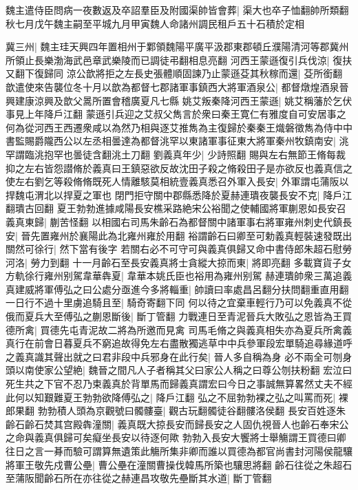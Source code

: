 魏主遣侍臣問病一夜數返及卒詔羣臣及附國渠帥皆會葬|{
	渠大也卒子恤翻帥所類翻}
秋七月戊午魏主嗣至平城九月甲寅魏人命諸州調民租戶五十石積於定相

冀三州|{
	魏主珪天興四年置相州于鄴領魏陽平廣平汲郡東郡頓丘濮陽清河等郡冀州所領止長樂渤海武邑章武樂陵而已調徒弔翻相息亮翻}
河西王蒙遜復引兵伐涼|{
	復扶又翻下復歸同}
涼公歆將拒之左長史張體順固諫乃止蒙遜芟其秋稼而還|{
	芟所銜翻}
歆遣使來告襲位冬十月以歆為都督七郡諸軍事鎮西大將軍酒泉公|{
	都督燉煌酒泉晉興建康涼興及歆父暠所置會稽廣夏凡七縣}
姚艾叛秦降河西王蒙遜|{
	姚艾稱藩於乞伏事見上年降戶江翻}
蒙遜引兵迎之艾叔父雋言於衆曰秦王寛仁有雅度自可安居事之何為從河西王西遷衆咸以為然乃相與逐艾推雋為主復歸於秦秦王熾磐徵雋為侍中中書監賜爵隴西公以左丞相曇達為都督洮罕以東諸軍事征東大將軍秦州牧鎮南安|{
	洮罕謂臨洮抱罕也曇徒含翻洮土刀翻}
劉義真年少|{
	少詩照翻}
賜與左右無節王脩每裁抑之左右皆怨譛脩於義真曰王鎮惡欲反故沈田子殺之脩殺田子是亦欲反也義真信之使左右劉乞等殺脩脩既死人情離駭莫相統壹義真悉召外軍入長安|{
	外軍謂屯蒲阪以捍魏屯渭北以捍夏之軍也}
閉門拒守關中郡縣悉降於夏赫連璝夜襲長安不克|{
	降戶江翻璝古回翻}
夏王勃勃進據咸陽長安樵采路絶宋公裕聞之使輔國將軍蒯恩如長安召義真東歸|{
	蒯苦怪翻}
以相國右司馬朱齡石為都督關中諸軍事右將軍雍州刺史代鎮長安|{
	晉先置雍州於襄陽此為北雍州雍於用翻}
裕謂齡石曰卿至可勅義真輕裝速發既出關然可徐行|{
	然下當有後字}
若關右必不可守可與義真俱歸又命中書侍郎朱超石慰勞河洛|{
	勞力到翻}
十一月齡石至長安義真將士貪縱大掠而東|{
	將即亮翻}
多載寶貨子女方軌徐行雍州别駕韋華犇夏|{
	韋華本姚氏臣也裕用為雍州别駕}
赫連璝帥衆三萬追義真建威將軍傅弘之曰公處分亟進今多將輜重|{
	帥讀曰率處昌呂翻分扶問翻重直用翻}
一日行不過十里虜追騎且至|{
	騎奇寄翻下同}
何以待之宜棄車輕行乃可以免義真不從俄而夏兵大至傅弘之蒯恩斷後|{
	斷丁管翻}
力戰連日至青泥晉兵大敗弘之恩皆為王買德所禽|{
	買德先屯青泥故二將為所邀而見禽}
司馬毛脩之與義真相失亦為夏兵所禽義真行在前會日暮夏兵不窮追故得免左右盡散獨逃草中中兵參軍段宏單騎追尋緣道呼之義真識其聲出就之曰君非段中兵邪身在此行矣|{
	晉人多自稱為身}
必不兩全可刎身頭以南使家公望絶|{
	魏晉之間凡人子者稱其父曰家公人稱之曰尊公刎扶粉翻}
宏泣曰死生共之下官不忍乃束義真於背單馬而歸義真謂宏曰今日之事誠無算畧然丈夫不經此何以知艱難夏王勃勃欲降傅弘之|{
	降戶江翻}
弘之不屈勃勃裸之弘之叫罵而死|{
	裸郎果翻}
勃勃積人頭為京觀號曰髑髏臺|{
	觀古玩翻髑徒谷翻髏洛侯翻}
長安百姓逐朱齡石齡石焚其宫殿犇潼關|{
	義真既大掠長安而歸長安之人固仇視晉人也齡石奉宋公之命與義真俱歸可矣癡坐長安以待逐何歟}
勃勃入長安大饗將士舉觴謂王買德曰卿往日之言一朞而驗可謂算無遺策此觴所集非卿而誰以買德為都官尚書封河陽侯龍驤將軍王敬先戍曹公壘|{
	曹公壘在潼關曹操伐韓馬所築也驤思將翻}
齡石往從之朱超石至蒲阪聞齡石所在亦往從之赫連昌攻敬先壘斷其水道|{
	斷丁管翻}
